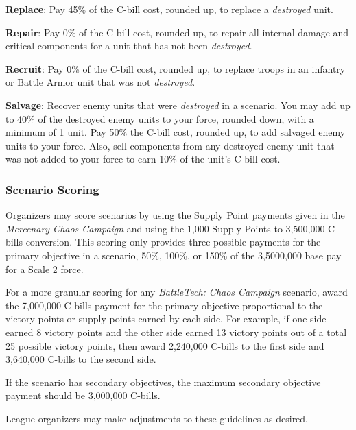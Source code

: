 \begin{description}

\item {\bfseries Replace}: Pay 45\% of the C-bill cost, rounded up, to replace a \emph{destroyed} unit.

\item {\bfseries Repair}: Pay 0\% of the C-bill cost, rounded up, to repair all internal damage and critical components for a unit that has not been \emph{destroyed}.

\item {\bfseries Recruit}: Pay 0\% of the C-bill cost, rounded up, to replace troops in an infantry or Battle Armor unit that was not \emph{destroyed}.

\item {\bfseries Salvage}: Recover enemy units that were \emph{destroyed} in a scenario.
You may add up to 40\% of the destroyed enemy units to your force, rounded down, with a minimum of 1 unit.
Pay 50\% the C-bill cost, rounded up, to add salvaged enemy units to your force.
Also, sell components from any destroyed enemy unit that was not added to your force to earn 10\% of the unit's C-bill cost.

\end{description}

\subsubsection{Scenario Scoring}

Organizers may score scenarios by using the Supply Point payments given in the \emph{Mercenary Chaos Campaign} and using the 1,000 Supply Points to 3,500,000 C-bills conversion.
This scoring only provides three possible payments for the primary objective in a scenario, 50\%, 100\%, or 150\% of the 3,5000,000 base pay for a Scale 2 force.

For a more granular scoring for any \emph{BattleTech: Chaos Campaign} scenario, award the 7,000,000 C-bills payment for the primary objective proportional to the victory points or supply points earned by each side.
For example, if one side earned 8 victory points and the other side earned 13 victory points out of a total 25 possible victory points, then award 2,240,000 C-bills to the first side and 3,640,000 C-bills to the second side.

If the scenario has secondary objectives, the maximum secondary objective payment should be 3,000,000 C-bills.

League organizers may make adjustments to these guidelines as desired.

